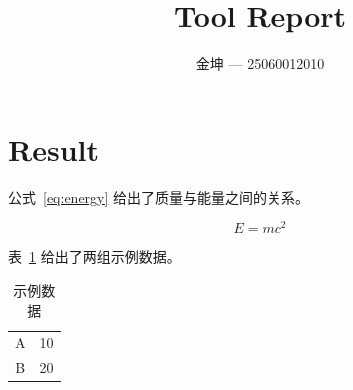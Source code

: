 \documentclass{ctexart}
\begin{document}
\title{Tool Report}
\author{金坤 --- 25060012010}
\date{}
\maketitle

\section{Result}

公式~\eqref{eq:energy} 给出了质量与能量之间的关系。

\begin{equation}
    E = mc^2
    \label{eq:energy}
\end{equation}

表~\ref{tab:data} 给出了两组示例数据。

\begin{table}[h]
    \centering
    \begin{tabular}{cc}
        A & 10 \\
        B & 20
    \end{tabular}
    \caption{示例数据}
    \label{tab:data}
\end{table}
\end{document}
